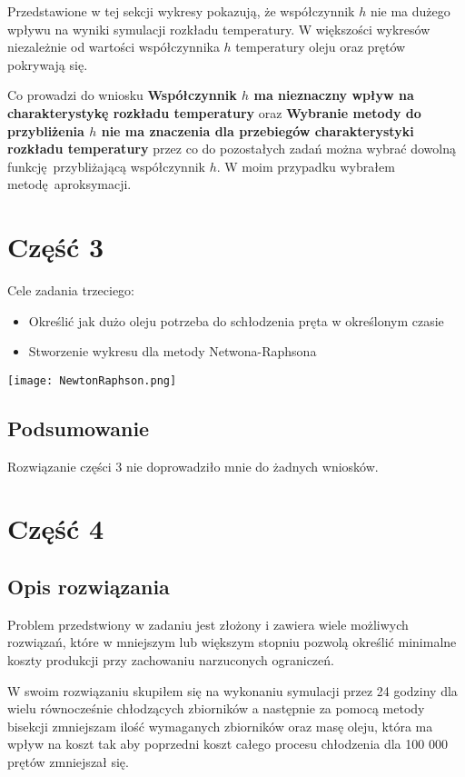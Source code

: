 \documentclass[varwidth,12pt,a4paper]{article}
\begin{document}
Przedstawione w tej sekcji wykresy pokazują, że współczynnik $h$ nie ma dużego wpływu na 
wyniki symulacji rozkładu temperatury. W większości wykresów niezależnie od wartości współczynnika $h$
temperatury oleju oraz prętów pokrywają się.

Co prowadzi do wniosku \textbf{Współczynnik $h$ ma nieznaczny wpływ na charakterystykę rozkładu temperatury}
oraz \textbf{Wybranie metody do przybliżenia $h$ nie ma znaczenia dla przebiegów charakterystyki rozkładu temperatury}
przez co do pozostałych zadań można wybrać dowolną funkcję przybliżającą współczynnik $h$.
W moim przypadku wybrałem metodę aproksymacji.

\section{Część 3}

Cele zadania trzeciego:

\begin{itemize}
  \item Określić jak dużo oleju potrzeba do schłodzenia pręta w określonym czasie
  \item Stworzenie wykresu dla metody Netwona-Raphsona
\end{itemize}

\texttt{[image: NewtonRaphson.png]} 

\subsection{Podsumowanie}

Rozwiązanie części 3 nie doprowadziło mnie do żadnych wniosków.

\section{Część 4}

\subsection{Opis rozwiązania}

Problem przedstwiony w zadaniu jest złożony i zawiera wiele możliwych rozwiązań, które w mniejszym
lub większym stopniu pozwolą określić minimalne koszty produkcji przy zachowaniu narzuconych
ograniczeń.

W swoim rozwiązaniu skupiłem się na wykonaniu symulacji przez 24 godziny dla wielu 
równocześnie chłodzących zbiorników a następnie za pomocą metody bisekcji zmniejszam
ilość wymaganych zbiorników oraz masę oleju, która ma wpływ na koszt tak aby poprzedni koszt
całego procesu chłodzenia dla 100 000 prętów zmniejszał się. 
\end{document}
